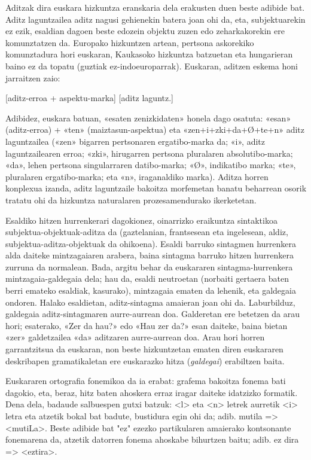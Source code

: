 \begin{multicols}{2}
Aditzak dira euskara hizkuntza eranskaria dela erakusten duen beste adibide bat. Aditz laguntzailea aditz nagusi gehienekin batera joan ohi da, eta, subjektuarekin ez ezik, esaldian dagoen beste edozein objektu zuzen edo zeharkakorekin ere komunztatzen da. Europako hizkuntzen artean, pertsona askorekiko komunztadura hori euskaran, Kaukasoko hizkuntza batzuetan eta hungarieran baino ez da topatu (guztiak ez-indoeuroparrak). Euskaran, aditzen eskema honi jarraitzen zaio:

\hspace{10pt}[aditz-erroa + aspektu-marka] [aditz laguntz.]

Adibidez, euskara batuan, «esaten zenizkidaten» honela dago osatuta: «esan» (aditz-erroa) + «ten» (maiztasun-aspektua) eta «zen+i+zki+da+Ø+te+n» aditz laguntzailea («zen» bigarren pertsonaren ergatibo-marka da; «i», aditz laguntzailearen erroa; «zki», hirugarren pertsona pluralaren absolutibo-marka; «da», lehen pertsona singularraren datibo-marka; «Ø», indikatibo marka; «te», pluralaren ergatibo-marka; eta «n», iraganaldiko marka).  Aditza horren konplexua izanda, aditz laguntzaile bakoitza morfemetan banatu beharrean osorik tratatu ohi da hizkuntza naturalaren prozesamendurako ikerketetan.

Esaldiko hitzen hurrenkerari dagokionez, oinarrizko eraikuntza sintaktikoa subjektua-objektuak-aditza da (gaztelanian, frantsesean eta ingelesean, aldiz, subjektua-aditza-objektuak da ohikoena). Esaldi barruko sintagmen hurrenkera alda daiteke mintzagaiaren arabera, baina sintagma barruko hitzen hurrenkera zurruna da normalean. Bada, argitu behar da euskararen sintagma-hurrenkera mintzagaia-galdegaia dela; hau da, esaldi neutroetan (norbaiti gertaera baten berri emateko esaldiak, kasurako), mintzagaia ematen da lehenik, eta galdegaia ondoren. Halako esaldietan, aditz-sintagma amaieran joan ohi da. Laburbilduz, galdegaia aditz-sintagmaren aurre-aurrean doa. Galderetan ere betetzen da arau hori; esaterako, «Zer da hau?» edo «Hau zer da?» esan daiteke, baina bietan «zer» galdetzailea «da» aditzaren aurre-aurrean doa. Arau hori horren garrantzitsua da euskaran, non beste hizkuntzetan ematen diren euskararen deskribapen gramatikaletan ere euskarazko hitza (\textit{galdegai}) erabiltzen baita.

Euskararen ortografia fonemikoa da ia erabat: grafema bakoitza fonema bati dagokio, eta, beraz, hitz baten ahoskera erraz iragar daiteke idatzizko formatik. Dena dela, badaude salbuespen gutxi batzuk: <l> eta <n> letrek aurretik <i> letra eta atzetik bokal bat badute, bustidura egin ohi da; adib. mutila => <mutiLa>. Beste adibide bat "ez" ezezko partikularen amaierako kontsonante fonemarena da, atzetik datorren fonema ahoskabe bihurtzen baitu; adib. ez dira => <eztira>.


\end{multicols}
